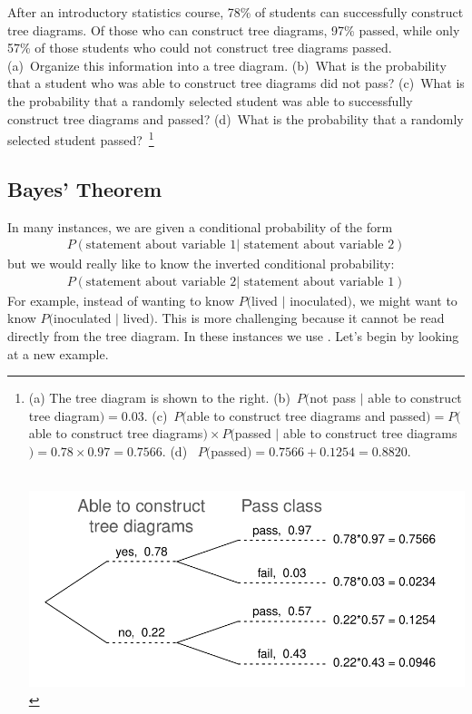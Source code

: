 \begin{exercise}
After an introductory statistics course, 78\% of students can successfully construct tree diagrams. Of those who can construct tree diagrams, 97\% passed, while only 57\% of those students who could not construct tree diagrams passed. (a)~Organize this information into a tree diagram. {(b)~What is the probability that a student who was able to construct tree diagrams did not pass? (c)~What is the probability that a randomly selected student was able to successfully construct tree diagrams and passed? (d)~What is the probability that a randomly selected student passed?}\
\footnote{\begin{minipage}[t]{0.47\linewidth}
(a) The tree diagram is shown to the right.
(b)~$P($not pass $|$ able to construct tree diagram$) = 0.03$.
(c)~$P($able to construct tree diagrams and passed$) = P($able to construct tree diagrams$) \times P($passed $|$ able to construct tree diagrams$) = 0.78 \times 0.97 = 0.7566$.
(d)~ $P($passed$) = 0.7566 + 0.1254 = 0.8820$. \vspace{15mm} \\\
\end{minipage}
\begin{minipage}[c]{0.5\linewidth}
\includegraphics[width=\textwidth]{ch_probability/figures/treeDiagramAndPass/treeDiagramAndPass} \vspace{-25mm}
\end{minipage}}
\end{exercise}


\subsection{Bayes' Theorem}
\label{bayesTheoremSubsection}


In many instances, we are given a conditional probability of the form
\begin{align*}
P(\text{statement about variable 1} | \text{ statement about variable 2})
\end{align*}
but we would really like to know the inverted conditional probability:
\begin{align*}
P(\text{statement about variable 2} | \text{ statement about variable 1})
\end{align*}
For example, instead of wanting to know $P($lived $|$ inoculated$)$, we might want to know $P($inoculated $|$ lived$)$. This is more challenging because it cannot be read directly from the tree diagram. In these instances we use . Let's begin by looking at a new example.

